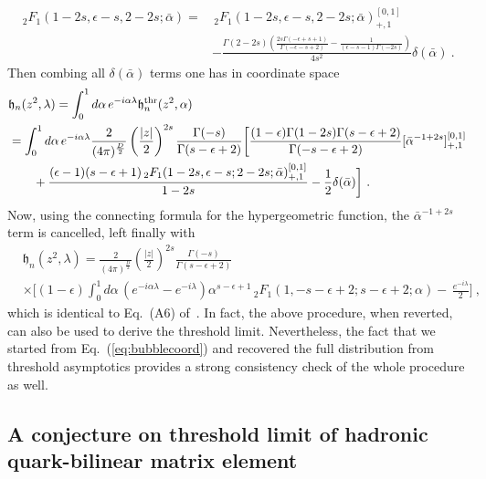 \documentclass[a4paper,11pt]{article}
\begin{document}
\begin{align}
\,_2F_1(1-2s,\epsilon-s,2-2s;\bar \alpha) =&\,_2F_1(1-2s,\epsilon-s,2-2s;\bar  \alpha)_{+,1}^{[0,1]}\nonumber \\ 
&-\frac{\Gamma (2-2 s) \left(\frac{2 s \Gamma (-\epsilon+s+1)}{\Gamma (-\epsilon-s+2)}-\frac{1}{(\epsilon-s-1) \Gamma (-2 s)}\right)}{4 s^2} \delta(\bar \alpha) \ .
\end{align}
Then combing all $\delta(\bar \alpha)$ terms one has in coordinate space
\begin{align}
&\mathfrak{h}_n(z^2,\lambda) = \int_{0}^{1} d\alpha \, e^{-i \alpha \lambda} \mathfrak{h}_n^{\rm thr}(z^2,\alpha) \nonumber\\
&= \int_{0}^{1} d\alpha \, e^{-i \alpha \lambda} \frac{2}{(4\pi)^{\frac{D}{2}}}\left(\frac{|z|}{2}\right)^{2s} \frac{\Gamma (-s)}{\Gamma (s-\epsilon +2)} \bigg[ \frac{(1-\epsilon ) \Gamma (1-2 s) \Gamma (s-\epsilon +2)}{\Gamma (-s-\epsilon +2)} [\bar \alpha^{-1+2s}]^{[0,1]}_{+,1} \nonumber\\ 
&\quad \quad +\frac{(\epsilon -1) (s-\epsilon +1) \, _2F_1(1-2 s,\epsilon -s;2-2 s; \bar \alpha )_{+,1}^{[0,1]}}{1-2 s} -\frac{1}{2} \delta (\bar \alpha ) \bigg]  \ . 
\end{align}
Now, using the connecting formula for the hypergeometric function, the $\bar \alpha^{-1+2s}$ term is cancelled, left finally with 
\begin{align}
&\mathfrak{h}_n(z^2,\lambda)=\frac{2}{(4\pi)^{\frac{D}{2}}}\left(\frac{|z|}{2}\right)^{2s} \frac{\Gamma (-s)}{\Gamma (s-\epsilon +2)} 
\nonumber \\ 
&\times \bigg[(1-\epsilon) \int_{0}^{1} d\alpha \,(e^{-i \alpha \lambda} - e^{-i \lambda})  \alpha ^{s-\epsilon +1} \, _2F_1(1,-s-\epsilon +2;s-\epsilon+2;\alpha ) - \, \frac{e^{-i \lambda}}{2} \bigg] \ ,
\end{align}
which is identical to Eq.~(A6) of~\cite{Braun:2018brg}.  In fact, the above procedure, when reverted, can also be used to derive the threshold limit. Nevertheless, the fact that we started from Eq.~(\ref{eq:bubblecoord}) and recovered the full distribution from threshold asymptotics provides a strong consistency check of the whole procedure as well. 

\subsection{A conjecture on threshold limit of hadronic quark-bilinear matrix element}
\end{document}
